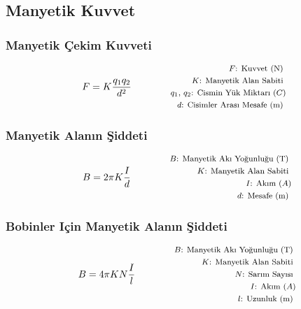 \subsection{Manyetik Kuvvet}

\subsubsection*{Manyetik Çekim Kuvveti}
\begin{equation}
    F = K\frac{q_1 q_2}{d^2} \qquad \qquad \parbox{4cm}{\footnotesize$\begin{aligned}
        F\text{: Kuvvet (N) } \\
        K\text{: Manyetik Alan Sabiti } \\
        q_1\text{, }q_2\text{: Cismin Yük Miktarı } (C) \\
        d\text{: Cisimler Arası Mesafe (m) }
\end{aligned}$}
\end{equation}

\subsubsection*{Manyetik Alanın Şiddeti}
\begin{equation}
    B = 2\pi K \frac{I}{d} \qquad \qquad \parbox{4cm}{\footnotesize$\begin{aligned}
        B\text{: Manyetik Akı Yoğunluğu (T) } \\
        K\text{: Manyetik Alan Sabiti } \\
        I\text{: Akım } (A) \\
        d\text{: Mesafe (m) }
\end{aligned}$}
\end{equation}

\subsubsection*{Bobinler Için Manyetik Alanın Şiddeti}
\begin{equation}
    B = 4\pi K  N \frac{I}{l} \qquad \qquad \parbox{4cm}{\footnotesize$\begin{aligned}
        B\text{: Manyetik Akı Yoğunluğu (T) } \\
        K\text{: Manyetik Alan Sabiti } \\
        N\text{: Sarım Sayısı } \\
        I\text{: Akım } (A) \\
        l\text{: Uzunluk (m) }
\end{aligned}$}
\end{equation}
